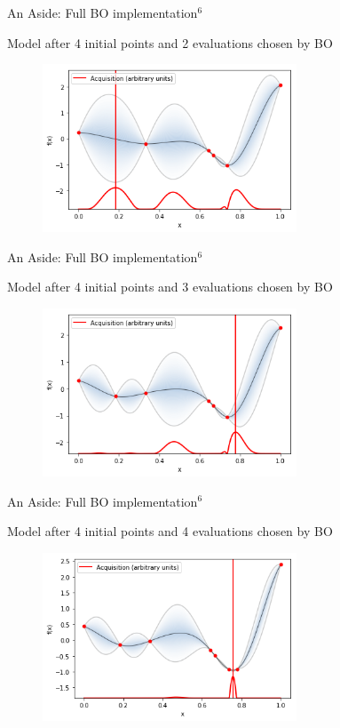\documentclass{beamer}
\begin{document}
\begin{frame}{An Aside: Full BO implementation$^6$}
	\begin{block}{}
		Model after 4 initial points and 2 evaluations chosen by BO
		\begin{figure}[h]
			\begin{center}
				\includegraphics[height=5cm]{BO2}
			\end{center}
		\end{figure}
	\end{block}
\end{frame}
\begin{frame}{An Aside: Full BO implementation$^6$}
	\begin{block}{}
		Model after 4 initial points and 3 evaluations chosen by BO
		\begin{figure}[h]
			\begin{center}
				\includegraphics[height=5cm]{BO3}
			\end{center}
		\end{figure}
	\end{block}
\end{frame}
\begin{frame}{An Aside: Full BO implementation$^6$}
	\begin{block}{}
		Model after 4 initial points and 4 evaluations chosen by BO
		\begin{figure}[h]
			\begin{center}
				\includegraphics[height=5cm]{BO4}
			\end{center}
		\end{figure}
	\end{block}
\end{frame}
\end{document}
